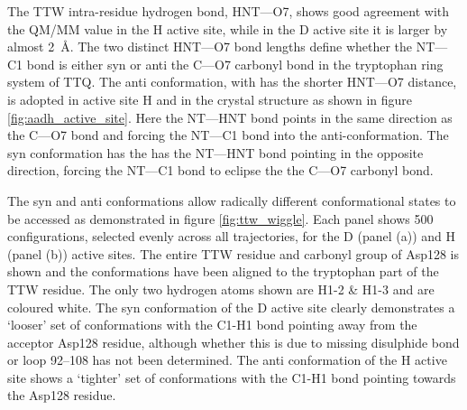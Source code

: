 The TTW intra-residue hydrogen bond, HNT---O7, shows good agreement with the QM/MM value in the H active site, while in the D active site it is larger by almost \SI{2}{\angstrom}. The two distinct HNT---O7 bond lengths define whether the NT---C1 bond is either syn or anti the C---O7 carbonyl bond in the tryptophan ring system of TTQ. The anti conformation, with has the shorter HNT---O7 distance, is adopted in active site H and in the crystal structure as shown in figure \ref{fig:aadh_active_site}.  Here the NT---HNT bond points in the same direction as the C---O7 bond and forcing the NT---C1 bond into the anti-conformation. The syn conformation has the has the NT---HNT bond pointing in the opposite direction, forcing the NT---C1 bond to eclipse the the C---O7 carbonyl bond. 

The syn and anti conformations allow radically different conformational states to be accessed as demonstrated in figure \ref{fig:ttw_wiggle}. Each panel shows \num{500} configurations, selected evenly across all trajectories, for the D (panel (a)) and H (panel (b)) active sites. The entire TTW residue and carbonyl group of Asp128 is shown and the conformations have been aligned to the tryptophan part of the TTW residue. The only two hydrogen atoms shown are H1-2 \& H1-3 and are coloured white. The syn conformation of the D active site clearly demonstrates a `looser' set of conformations with the  C1-H1 bond pointing away from the acceptor Asp128 residue, although whether this is due to missing disulphide bond or loop \numrange[range-phrase=\text{--}]{92}{108} has not been determined. The anti conformation of the H active site shows a `tighter' set of conformations with the C1-H1 bond pointing towards the Asp128 residue. 

